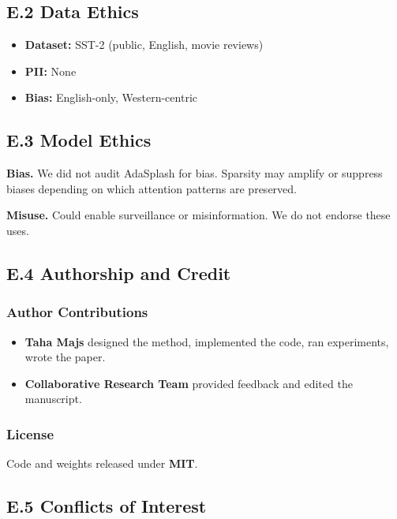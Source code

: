 \subsection{E.2 Data Ethics}

\begin{itemize}
\item \textbf{Dataset:} SST-2 (public, English, movie reviews)
\item \textbf{PII:} None
\item \textbf{Bias:} English-only, Western-centric

\end{itemize}
\subsection{E.3 Model Ethics}

\textbf{Bias.} We did not audit AdaSplash for bias. Sparsity may amplify or suppress 
biases depending on which attention patterns are preserved.

\textbf{Misuse.} Could enable surveillance or misinformation. We do not endorse 
these uses.

\subsection{E.4 Authorship and Credit}

\subsubsection{Author Contributions}

\begin{itemize}
\item \textbf{Taha Majs} designed the method, implemented the code, ran experiments,
  wrote the paper.
\item \textbf{Collaborative Research Team} provided feedback and edited the manuscript.

\end{itemize}
\subsubsection{License}

Code and weights released under \textbf{MIT}.

\subsection{E.5 Conflicts of Interest}

